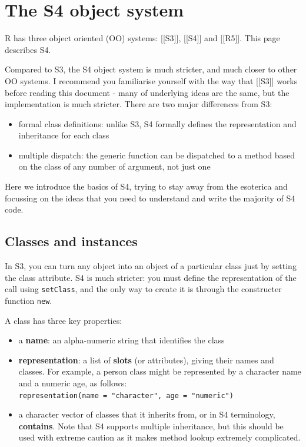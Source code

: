 \hypertarget{the-s4-object-system}{%
\chapter{The S4 object system}\label{the-s4-object-system}}

R has three object oriented (OO) systems: {[}{[}S3{]}{]}, {[}{[}S4{]}{]}
and {[}{[}R5{]}{]}. This page describes S4.

Compared to S3, the S4 object system is much stricter, and much closer
to other OO systems. I recommend you familiarise yourself with the way
that {[}{[}S3{]}{]} works before reading this document - many of
underlying ideas are the same, but the implementation is much stricter.
There are two major differences from S3:

\begin{itemize}
\item
  formal class definitions: unlike S3, S4 formally defines the
  representation and inheritance for each class
\item
  multiple dispatch: the generic function can be dispatched to a method
  based on the class of any number of argument, not just one
\end{itemize}

Here we introduce the basics of S4, trying to stay away from the
esoterica and focussing on the ideas that you need to understand and
write the majority of S4 code.

\hypertarget{classes-and-instances}{%
\section{Classes and instances}\label{classes-and-instances}}

In S3, you can turn any object into an object of a particular class just
by setting the class attribute. S4 is much stricter: you must define the
representation of the call using \texttt{setClass}, and the only way to
create it is through the constructer function \texttt{new}.

A class has three key properties:

\begin{itemize}
\item
  a \textbf{name}: an alpha-numeric string that identifies the class
\item
  \textbf{representation}: a list of \textbf{slots} (or attributes),
  giving their names and classes. For example, a person class might be
  represented by a character name and a numeric age, as follows:
  \texttt{representation(name\ =\ "character",\ age\ =\ "numeric")}
\item
  a character vector of classes that it inherits from, or in S4
  terminology, \textbf{contains}. Note that S4 supports multiple
  inheritance, but this should be used with extreme caution as it makes
  method lookup extremely complicated.
\end{itemize}

